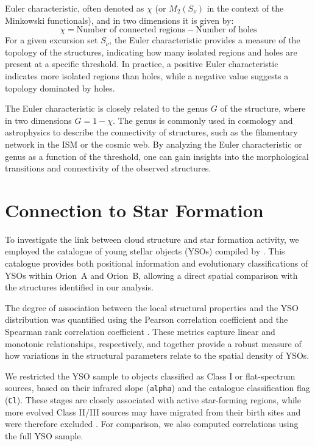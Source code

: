 Euler characteristic, often denoted as $\chi$ (or $M_2(S_{\nu})$ in the context of the Minkowski functionals), and in two dimensions it is given by:
\begin{equation}
    \chi = \text{Number of connected regions} - \text{Number of holes}
\end{equation}
For a given excursion set $S_{\nu}$, the Euler characteristic provides a measure of the topology of the structures, indicating how many isolated regions and holes are present at a specific threshold. In practice, a positive Euler characteristic indicates more isolated regions than holes, while a negative value suggests a topology dominated by holes.

The Euler characteristic is closely related to the genus $G$ of the structure, where in two dimensions $G = 1 - \chi$. The genus is commonly used in cosmology and astrophysics to describe the connectivity of structures, such as the filamentary network in the ISM or the cosmic web. By analyzing the Euler characteristic or genus as a function of the threshold, one can gain insights into the morphological transitions and connectivity of the observed structures.

\section{Connection to Star Formation}

To investigate the link between cloud structure and star formation activity, we employed the catalogue of young stellar objects (YSOs) compiled by \cite{megeath2012catalogue}.  
This catalogue provides both positional information and evolutionary classifications of YSOs within Orion~A and Orion~B, allowing a direct spatial comparison with the structures identified in our analysis.

The degree of association between the local structural properties and the YSO distribution was quantified using the Pearson correlation coefficient \cite{pearson1895vii} and the Spearman rank correlation coefficient \cite{sedgwick2014spearman}.  
These metrics capture linear and monotonic relationships, respectively, and together provide a robust measure of how variations in the structural parameters relate to the spatial density of YSOs.

We restricted the YSO sample to objects classified as Class I or flat-spectrum sources, based on their infrared slope (\texttt{alpha}) and the catalogue classification flag (\texttt{Cl}). These stages are closely associated with active star-forming regions, while more evolved Class II/III sources may have migrated from their birth sites and were therefore excluded \cite{lada1987star}. For comparison, we also computed correlations using the full YSO sample.

